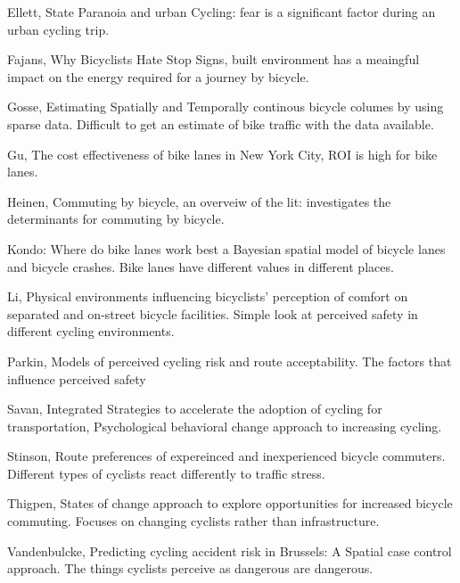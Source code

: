 \documentclass[11pt]{article} %
\begin{document}
Ellett, State Paranoia and urban Cycling: fear is a significant factor during an urban cycling trip. \cite{ellett2018state}

Fajans, Why Bicyclists Hate Stop Signs, built environment has a meaingful impact on the energy required for a journey by bicycle. \cite{fajans2001bicyclists}

Gosse, Estimating Spatially and Temporally continous bicycle columes by using sparse data. Difficult to get an estimate of bike traffic with the data available. \cite{gosse2014estimating}

Gu, The cost effectiveness of bike lanes in New York City, ROI is high for bike lanes. \cite{gu2017cost}

Heinen, Commuting by bicycle, an overveiw of the lit: investigates the determinants for commuting by bicycle. \cite{heinen2010commuting}

Kondo: Where do bike lanes work best a Bayesian spatial model of bicycle lanes and bicycle crashes. Bike lanes have different values in different places. \cite{kondo2018bike}

Li, Physical environments influencing bicyclists' perception of comfort on separated and on-street bicycle facilities. Simple look at perceived safety in different cycling environments. \cite{li2012physical}

Parkin, Models of perceived cycling risk and route acceptability. The factors that influence perceived safety \cite{parkin2007models}

Savan, Integrated Strategies to accelerate the adoption of cycling for transportation, Psychological behavioral change approach to increasing cycling. \cite{savan2017integrated}

Stinson, Route preferences of expereinced and inexperienced bicycle commuters. Different types of cyclists react differently to traffic stress. \cite{stinson2005comparison}

Thigpen, States of change approach to explore opportunities for increased bicycle commuting. Focuses on changing cyclists rather than infrastructure. \cite{thigpen2015using}

Vandenbulcke, Predicting cycling accident risk in Brussels: A Spatial case control approach. The things cyclists perceive as dangerous are dangerous. \cite{vandenbulcke2014predicting}
\end{document}
